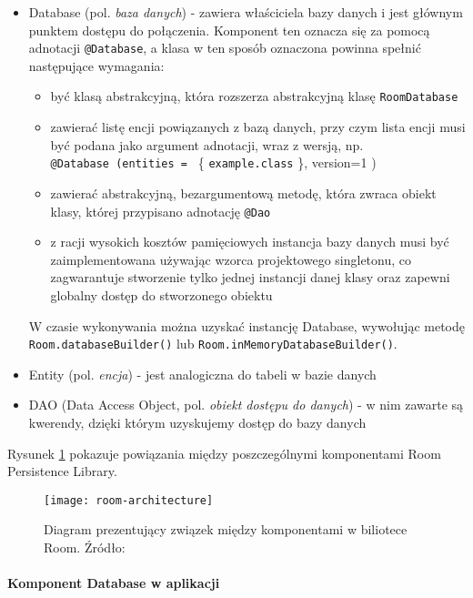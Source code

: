 \documentclass[a4paper,12pt]{article}
\newcommand{\imagewidth}{1.0}
\begin{document}
\begin{itemize}
	\item Database (pol. \textit{baza danych}) - zawiera właściciela bazy danych i jest głównym punktem dostępu do połączenia. Komponent ten oznacza się za pomocą adnotacji \texttt{@Database}, a klasa w ten sposób oznaczona powinna spełnić następujące wymagania:
	\begin{itemize}
		\item być klasą abstrakcyjną, która rozszerza abstrakcyjną klasę \texttt{RoomDatabase}
		\item zawierać listę encji powiązanych z bazą danych, przy czym lista encji musi być podana jako argument adnotacji, wraz z wersją, np. \\ \texttt{@Database (entities = } \{ \texttt{example.class} \}, version=1 ) 
		\item zawierać abstrakcyjną, bezargumentową metodę, która zwraca obiekt klasy, której przypisano adnotację \texttt{@Dao}
		\item z racji wysokich kosztów pamięciowych instancja bazy danych musi być zaimplementowana używając wzorca projektowego singletonu, co zagwarantuje stworzenie tylko jednej instancji danej klasy oraz zapewni globalny dostęp do stworzonego obiektu
	\end{itemize}
	W czasie wykonywania można uzyskać instancję Database, wywołując metodę \texttt{Room.databaseBuilder()} lub \texttt{Room.inMemoryDatabaseBuilder()}.
	\item Entity (pol. \textit{encja}) - jest analogiczna do tabeli w bazie danych
	\item DAO (Data Access Object, pol. \textit{obiekt dostępu do danych}) - w nim zawarte są kwerendy, dzięki którym uzyskujemy dostęp do bazy danych
\end{itemize}

Rysunek \ref{fig:room-architecture} pokazuje powiązania między poszczególnymi komponentami Room Persistence Library.

\begin{figure}[H]
    \centering
    \texttt{[image: room-architecture]}
    \caption{Diagram prezentujący związek między komponentami w biliotece Room. Źródło: \cite{room}}
    \label{fig:room-architecture}
\end{figure}

\paragraph{Komponent Database w aplikacji} ~\\
\end{document}
